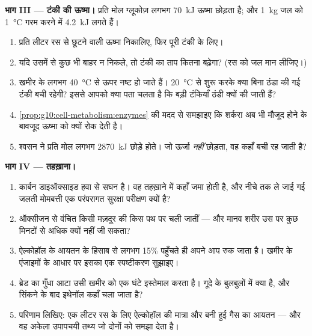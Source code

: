 \begin{problem}
\medskip
\noindent\textbf{भाग III --- टंकी की ऊष्मा।}
 प्रति मोल ग्लूकोज़ लगभग \qty{70}{kJ} ऊष्मा छोड़ता है; और
\qty{1}{kg} जल को \qty{1}{\celsius} गरम करने में \qty{4.2}{kJ} लगते हैं।
\begin{enumerate}[resume]
  \item प्रति लीटर रस से छूटने वाली ऊष्मा निकालिए, फिर पूरी टंकी के
        लिए।
  \item यदि उसमें से कुछ भी बाहर न निकले, तो टंकी का ताप कितना बढ़ेगा?
        (रस को जल मान लीजिए।)
  \item खमीर के  लगभग \qty{40}{\celsius} से ऊपर नष्ट हो जाते हैं।
        \qty{20}{\celsius} से शुरू करके क्या बिना ठंडा की गई टंकी बची
        रहेगी? इससे आपको क्या पता चलता है कि बड़ी टंकियाँ ठंडी क्यों की
        जाती हैं?
  \item \cref{prop:g10:cell-metabolism:enzymes} की मदद से समझाइए कि
        शर्करा अब भी मौजूद होने के बावजूद ऊष्मा  को क्यों रोक
        देती है।
  \item श्वसन ने प्रति मोल लगभग \qty{2870}{kJ} छोड़े होते। जो ऊर्जा
         \emph{नहीं} छोड़ता, वह कहाँ बची रह जाती है?
\end{enumerate}

\medskip
\noindent\textbf{भाग IV --- तहख़ाना।}
\begin{enumerate}[resume]
  \item कार्बन डाइऑक्साइड हवा से सघन है। वह तहख़ाने में कहाँ जमा होती
        है, और नीचे तक ले जाई गई जलती मोमबत्ती एक परंपरागत सुरक्षा
        परीक्षण क्यों है?
  \item ऑक्सीजन से वंचित किसी मज़दूर की  किस पथ पर चली जातीं ---
        और मानव शरीर उस पर कुछ मिनटों से अधिक क्यों नहीं जी सकता?
  \item ऐल्कोहॉल के आयतन के हिसाब से लगभग 15\% पहुँचते ही  अपने आप
        रुक जाता है। खमीर के एंजाइमों के आधार पर इसका एक स्पष्टीकरण
        सुझाइए।
  \item ब्रेड का गुँधा आटा उसी खमीर को एक घंटे इस्तेमाल करता है। गूदे के
        बुलबुलों में क्या है, और सिंकने के बाद इथेनॉल कहाँ चला जाता है?
  \item परिणाम लिखिए: एक लीटर रस के लिए ऐल्कोहॉल की मात्रा और बनी हुई
        गैस का आयतन --- और वह अकेला उपापचयी तथ्य जो दोनों को समझा देता
        है।
\end{enumerate}
\end{problem}
